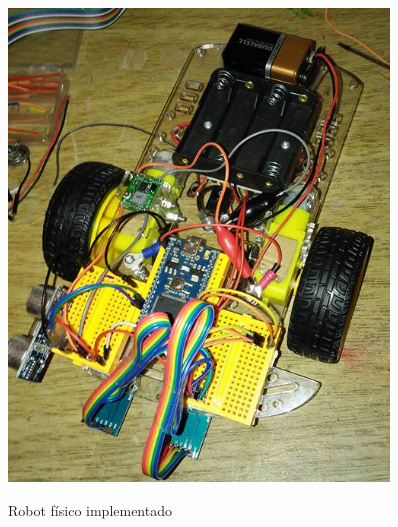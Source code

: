 \begin{figure}[!htb]
\begin{center}
\caption{Robot físico implementado}
\includegraphics[width=0.9\textwidth]{graphs/alf.jpg}
\label{fig:robotfisico}
\end{center}
\end{figure}


